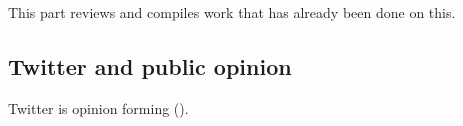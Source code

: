 This part reviews and compiles work that has already been done on this.

\subsection{Twitter and public opinion}
Twitter is opinion forming (\cite{hu_breaking_2012}).